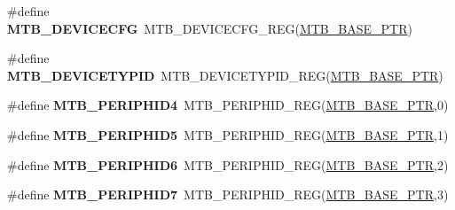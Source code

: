 \begin{DoxyCompactItemize}
\item 
\mbox{\label{group___m_t_b___register___accessor___macros_ga2612f1a6a7623fbe2e55b49a028e227e}} 
\#define {\bfseries M\+T\+B\+\_\+\+D\+E\+V\+I\+C\+E\+C\+FG}~M\+T\+B\+\_\+\+D\+E\+V\+I\+C\+E\+C\+F\+G\+\_\+\+R\+EG(\hyperlink{group___m_t_b___peripheral_gadf7f362dfa67354951e6a23ddf08cd73}{M\+T\+B\+\_\+\+B\+A\+S\+E\+\_\+\+P\+TR})
\item 
\mbox{\label{group___m_t_b___register___accessor___macros_gae7594a40064338c8e22f729511a20475}} 
\#define {\bfseries M\+T\+B\+\_\+\+D\+E\+V\+I\+C\+E\+T\+Y\+P\+ID}~M\+T\+B\+\_\+\+D\+E\+V\+I\+C\+E\+T\+Y\+P\+I\+D\+\_\+\+R\+EG(\hyperlink{group___m_t_b___peripheral_gadf7f362dfa67354951e6a23ddf08cd73}{M\+T\+B\+\_\+\+B\+A\+S\+E\+\_\+\+P\+TR})
\item 
\mbox{\label{group___m_t_b___register___accessor___macros_ga9332069b62de88f23a50e30da92309ef}} 
\#define {\bfseries M\+T\+B\+\_\+\+P\+E\+R\+I\+P\+H\+I\+D4}~M\+T\+B\+\_\+\+P\+E\+R\+I\+P\+H\+I\+D\+\_\+\+R\+EG(\hyperlink{group___m_t_b___peripheral_gadf7f362dfa67354951e6a23ddf08cd73}{M\+T\+B\+\_\+\+B\+A\+S\+E\+\_\+\+P\+TR},0)
\item 
\mbox{\label{group___m_t_b___register___accessor___macros_gace0a08cd68372a002199a1e22336e027}} 
\#define {\bfseries M\+T\+B\+\_\+\+P\+E\+R\+I\+P\+H\+I\+D5}~M\+T\+B\+\_\+\+P\+E\+R\+I\+P\+H\+I\+D\+\_\+\+R\+EG(\hyperlink{group___m_t_b___peripheral_gadf7f362dfa67354951e6a23ddf08cd73}{M\+T\+B\+\_\+\+B\+A\+S\+E\+\_\+\+P\+TR},1)
\item 
\mbox{\label{group___m_t_b___register___accessor___macros_ga4bbace75b36a9ac1c9a7b03a2e0630f2}} 
\#define {\bfseries M\+T\+B\+\_\+\+P\+E\+R\+I\+P\+H\+I\+D6}~M\+T\+B\+\_\+\+P\+E\+R\+I\+P\+H\+I\+D\+\_\+\+R\+EG(\hyperlink{group___m_t_b___peripheral_gadf7f362dfa67354951e6a23ddf08cd73}{M\+T\+B\+\_\+\+B\+A\+S\+E\+\_\+\+P\+TR},2)
\item 
\mbox{\label{group___m_t_b___register___accessor___macros_gabba8ce30d730a550ca556a87ae361e5b}} 
\#define {\bfseries M\+T\+B\+\_\+\+P\+E\+R\+I\+P\+H\+I\+D7}~M\+T\+B\+\_\+\+P\+E\+R\+I\+P\+H\+I\+D\+\_\+\+R\+EG(\hyperlink{group___m_t_b___peripheral_gadf7f362dfa67354951e6a23ddf08cd73}{M\+T\+B\+\_\+\+B\+A\+S\+E\+\_\+\+P\+TR},3)

\end{DoxyCompactItemize}
